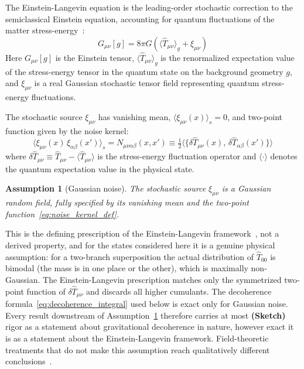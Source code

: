 \documentclass[12pt,a4paper]{article}
\newtheorem{assumption}{Assumption}
\theoremstyle{remark}
\begin{document}
The Einstein-Langevin equation is the leading-order stochastic correction to the
semiclassical Einstein equation, accounting for quantum fluctuations of the matter
stress-energy~\cite{hu_verdaguer}:
\begin{equation}
G_{\mu\nu}[g] = 8\pi G\!\left(\langle\hat{T}_{\mu\nu}\rangle_g + \xi_{\mu\nu}\right)
\label{eq:einstein_langevin}
\end{equation}
Here $G_{\mu\nu}[g]$ is the Einstein tensor, $\langle\hat{T}_{\mu\nu}\rangle_g$ is the
renormalized expectation value of the stress-energy tensor in the quantum state on the
background geometry $g$, and $\xi_{\mu\nu}$ is a real Gaussian stochastic tensor field
representing quantum stress-energy fluctuations.

The stochastic source $\xi_{\mu\nu}$ has vanishing mean,
$\langle\xi_{\mu\nu}(x)\rangle_s = 0$, and two-point function given by the noise kernel:
\begin{equation}
\langle\xi_{\mu\nu}(x)\,\xi_{\alpha\beta}(x')\rangle_s
= N_{\mu\nu\alpha\beta}(x,x')
\equiv \tfrac{1}{2}\langle\{\delta\hat{T}_{\mu\nu}(x),\,\delta\hat{T}_{\alpha\beta}(x')\}\rangle
\label{eq:noise_kernel_def}
\end{equation}
where $\delta\hat{T}_{\mu\nu} \equiv \hat{T}_{\mu\nu} - \langle\hat{T}_{\mu\nu}\rangle$
is the stress-energy fluctuation operator and $\langle\cdot\rangle$ denotes the quantum
expectation value in the physical state.

\begin{assumption}[Gaussian noise]
\label{ass:gaussian}
The stochastic source $\xi_{\mu\nu}$ is a \emph{Gaussian} random field, fully specified
by its vanishing mean and the two-point function~\eqref{eq:noise_kernel_def}.
\end{assumption}

\noindent
This is the defining prescription of the Einstein-Langevin framework~\cite{hu_verdaguer},
not a derived property, and for the states considered here it is a genuine physical
assumption: for a two-branch superposition the actual distribution of $\hat{T}_{00}$ is
bimodal (the mass is in one place or the other), which is maximally non-Gaussian. The
Einstein-Langevin prescription matches only the symmetrized two-point function of
$\delta\hat{T}_{\mu\nu}$ and discards all higher cumulants. The decoherence
formula~\eqref{eq:decoherence_integral} used below is exact only for Gaussian noise.
Every result downstream of Assumption~\ref{ass:gaussian} therefore carries at most
\textbf{(Sketch)} rigor as a statement about gravitational decoherence in nature, however
exact it is as a statement about the Einstein-Langevin framework. Field-theoretic
treatments that do not make this assumption reach qualitatively different
conclusions~\cite{anastopoulos_hu,blencowe}.
\end{document}
